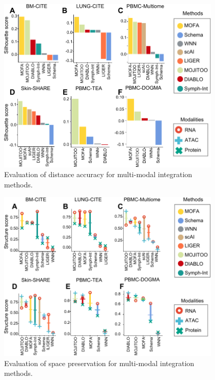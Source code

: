 \begin{figure}[!ht]
	\centering
	\includegraphics[width=0.95\textwidth]{silouette/fig}
	\vspace{0.1cm}
	\caption[Evaluation of distance accuracy for multi-modal integration methods.]{
        Evaluation of distance accuracy for multi-modal integration methods.}
	\label{fig:silouette}
\end{figure}


\begin{figure}[!ht]
	\centering
	\includegraphics[width=0.95\textwidth]{structure/fig}
	\vspace{0.1cm}
	\caption[Evaluation of space preservation for multi-modal integration methods.]{Evaluation of space preservation for multi-modal integration methods.}
	\label{fig:structure}
\end{figure}

